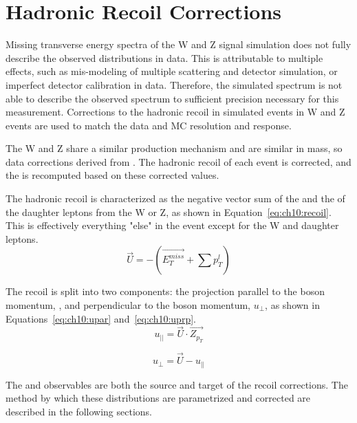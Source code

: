 \chapter{Hadronic Recoil Corrections}\label{ch:recoil}

Missing transverse energy spectra of the W and Z signal simulation does not fully describe the observed distributions in data. This is attributable to multiple effects, such as mis-modeling of multiple scattering and detector simulation, or imperfect detector calibration in data. Therefore, the simulated \met spectrum is not able to describe the observed \met spectrum to sufficient precision necessary for this measurement. Corrections to the hadronic recoil in simulated events in W and Z events are used to match the data and MC \met resolution and response. 

The W and Z share a similar production mechanism and are similar in mass, so data corrections derived from \zmm. The hadronic recoil of each event is corrected, and the \met is recomputed based on these corrected values. 

The hadronic recoil is characterized as the negative vector sum of the \met and the \pt of the daughter leptons from the W or Z, as shown in Equation~\ref{eq:ch10:recoil}. This is effectively everything "else" in the event except for the W and daughter leptons.
\begin{equation}
\vec{U}=-(\vec{E_T^{miss}}+\sum{p_{T}^l})
    \label{eq:ch10:recoil}
\end{equation}

The recoil is split into two components: the projection parallel to the boson momentum, \upar, and perpendicular to the boson momentum, $u_\perp$, as shown in Equations~\ref{eq:ch10:upar} and~\ref{eq:ch10:uprp}. 
\begin{equation}
    u_{||} = \vec{U}\cdot \vec{Z_{p_T}}
    \label{eq:ch10:upar}
\end{equation}

\begin{equation}
    u_\perp = \vec{U} -  u_{||}
    \label{eq:ch10:uprp}
\end{equation}


The \upar and \uprp observables are both the source and target of the recoil corrections. The method by which these distributions are parametrized and corrected are described in the following sections.



